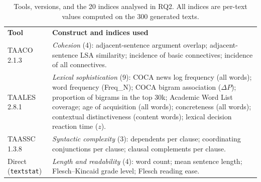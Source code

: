 \begin{table}[t]
   
  \begin{tabular}{@{}p{}p{}@{}}
    
    \textbf{Tool} & \textbf{Construct and indices used} \\
    
    TAACO 2.1.3 \newline \cite{Crossley2016TAACO}
      & \emph{Cohesion} (4): adjacent-sentence argument overlap;
        adjacent-sentence LSA similarity; incidence of basic
        connectives; incidence of all connectives. \\
    
    TAALES 2.8.1 \newline \cite{Kyle2015TAALES}
      & \emph{Lexical sophistication} (9): COCA news log frequency (all
        words); word frequency (Freq\_N); COCA bigram association
        ($\Delta P$); proportion of bigrams in the top 30k; Academic
        Word List coverage; age of acquisition (all words);
        concreteness (all words); contextual distinctiveness (content
        words); lexical decision reaction time ($z$). \\
    
    TAASSC 1.3.8 \newline \cite{Kyle2016TAASSC}
      & \emph{Syntactic complexity} (3): dependents per clause;
        coordinating conjunctions per clause; clausal complements per
        clause. \\
    
    Direct \newline (\texttt{textstat})
      & \emph{Length and readability} (4): word count; mean sentence
        length; Flesch--Kincaid grade level; Flesch reading ease. \\
    
  \end{tabular}
  \caption{Tools, versions, and the 20 indices analysed in RQ2.  All
           indices are per-text values computed on the 300 generated
           texts.}
  \label{tab:salat}
\end{table}
